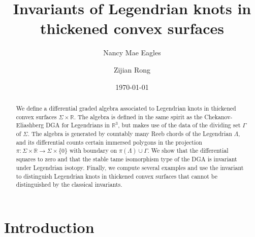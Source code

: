 \documentclass[11pt]{amsart}
\title[Invariants of Legendrian knots in thickened convex surfaces]{Invariants of Legendrian knots in thickened convex surfaces}
\author[Nancy Mae Eagles]{Nancy Mae Eagles}
\author[Zijian Rong]{Zijian Rong}
\date{\today}
\theoremstyle{mystyle}
\newcommand{\R}{\mathbb{R}}
\newcommand{\<}{\langle}
\renewcommand{\>}{\rangle}
\begin{document}
 


\begin{abstract}
    We define a differential graded algebra associated to Legendrian knots in thickened convex surfaces $\Sigma\times \R$. The algebra is defined in the same spirit as the Chekanov-Eliashberg DGA for Legendrians in $\R^3$, but makes use of the data of the dividing set $\Gamma$ of $\Sigma$. The algebra is generated by countably many Reeb chords of the Legendrian $\Lambda$, and its differential counts certain immersed polygons in the projection $\pi:\Sigma\times \R\to \Sigma\times \{0\}$ with boundary on $\pi(\Lambda)\cup \Gamma$. We show that the differential squares to zero and that the stable tame isomorphism type of the DGA is invariant under Legendrian isotopy. Finally, we compute several examples and use the invariant to distinguish Legendrian knots in thickened convex surfaces that cannot be distinguished by the classical invariants.
\end{abstract}

\maketitle



\tableofcontents

\section{Introduction}
\end{document}
